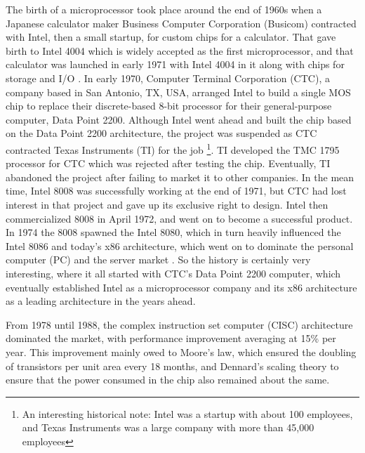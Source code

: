 \documentclass[journal]{IEEEtran}
\begin{document}
The birth of a microprocessor took place around the end of 1960s when a Japanese calculator maker Business Computer Corporation (Busicom) contracted with Intel, then a small startup, for custom chips for a calculator. That gave birth to Intel 4004 which is widely accepted as the first microprocessor, and that calculator was launched in early 1971 with Intel 4004 in it along with chips for storage and I/O \cite{faggin_history_1996}. In early 1970, Computer Terminal Corporation (CTC), a company based in San Antonio, TX, USA, arranged Intel to build a single MOS chip to replace their discrete-based 8-bit processor for their general-purpose computer, Data Point 2200. Although Intel went ahead and built the chip based on the Data Point 2200 architecture, the project was suspended as CTC contracted Texas Instruments (TI) for the job \footnote{An interesting historical note: Intel was a startup with about 100 employees, and Texas Instruments was a large company with more than 45,000 employees}. TI developed the TMC 1795 processor for CTC which was rejected after testing the chip. Eventually, TI abandoned the project after failing to market it to other companies. In the mean time, Intel 8008 was successfully working at the end of 1971, but CTC had lost interest in that project and gave up its exclusive right to design. Intel then commercialized 8008 in April 1972, and went on to become a successful product. In 1974 the 8008 spawned the Intel 8080, which in turn heavily influenced the Intel 8086 and today's x86 architecture, which went on to dominate the personal computer (PC) and the server market \cite{noauthor_intel_2024}. So the history is certainly very interesting, where it all started with CTC's Data Point 2200 computer, which eventually established Intel as a microprocessor company and its x86 architecture as a leading architecture in the years ahead.

From 1978 until 1988, the complex instruction set computer (CISC) architecture \cite{blem_power_2013} dominated the market, with performance improvement averaging at 15\% per year. This improvement mainly owed to Moore's law, which ensured the doubling of transistors per unit area every 18 months, and Dennard's scaling theory to ensure that the power consumed in the chip also remained about the same.
\end{document}
